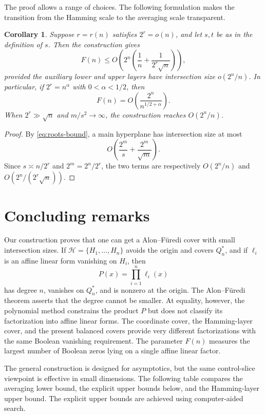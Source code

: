 \documentclass[11pt]{article}
\newtheorem{corollary}[theorem]{Corollary}
\newcommand{\Q}{Q}
\newcommand{\1}{\mathbf{1}}
\begin{document}
	The proof allows a range of choices. The following formulation makes the transition from the Hamming scale to the averaging scale transparent.
	
	\begin{corollary}\label{cor:range}
		Suppose $r=r(n)$ satisfies $2^r=o(n)$, and let $s,t$ be as in the definition of $s$. Then the construction gives
		\[
		F(n)\le O\!\left(2^n\left(\frac1n+\frac{1}{2^r\sqrt n}\right)\right),
		\]
		provided the auxiliary lower and upper layers have intersection size $o(2^n/n)$. In particular, if $2^r=n^\alpha$ with $0<\alpha<1/2$, then
		\[
		F(n)=O\!\left(\frac{2^n}{n^{1/2+\alpha}}\right).
		\]
		When $2^r\gg\sqrt n$ and $m/s^2\to\infty$, the construction reaches $O(2^n/n)$.
	\end{corollary}
	
	\begin{proof}
		By \eqref{eq:roots-bound}, a main hyperplane has intersection size at most
		\[
		O\!\left(\frac{2^m}{s}+\frac{2^m}{\sqrt m}\right).
		\]
		Since $s\asymp n/2^r$ and $2^m=2^n/2^r$, the two terms are respectively $O(2^n/n)$ and $O(2^n/(2^r\sqrt n))$.
	\end{proof}
	
	
	\section{Concluding remarks}\label{sec:concluding}
	
	Our construction proves that  one can get a Alon--F\"uredi cover with small intersection sizes.   If $\mathcal H=\{H_1,\dots,H_n\}$ avoids the origin and covers $\Q_n^*$, and if $\ell_i$ is an affine linear form vanishing on $H_i$, then
	\[
	P(x)=\prod_{i=1}^n\ell_i(x)
	\]
	has degree $n$, vanishes on $\Q_n^*$, and is nonzero at the origin. The Alon--F\"uredi theorem asserts that the degree cannot be smaller. At equality, however, the polynomial method constrains the product $P$ but does not classify its factorization into affine linear forms. The coordinate cover, the Hamming-layer cover, and the present balanced covers provide very different factorizations with the same Boolean vanishing requirement. The parameter $F(n)$ measures the largest number of Boolean zeros lying on a single affine linear factor.
	
	
	
	The general construction is designed for asymptotics, but the same control-slice viewpoint is effective in small dimensions. The following table compares the averaging lower bound, the explicit upper bounds below, and the Hamming-layer upper bound. The explicit upper bounds are achieved using computer-aided search.
	
\end{document}
